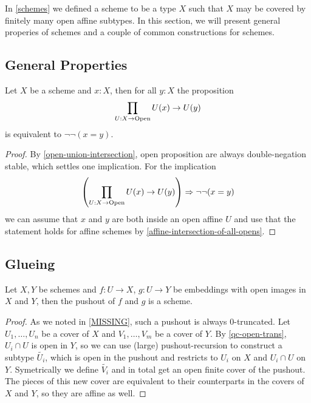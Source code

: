 In \cref{schemes} we defined a scheme to be a type $X$ such that $X$
may be covered by finitely many open affine subtypes.
In this section, we will present general properies of schemes and a couple of common constructions for schemes.


\subsection{General Properties}

\begin{lemma}%
  \label{intersection-of-all-opens}
  Let $X$ be a scheme and $x:X$, then for all $y:X$ the proposition
  \[ \prod_{U:X\to \mathrm{Open}}U(x)\to U(y) \]
  is equivalent to $\neg\neg (x=y)$.
\end{lemma}

\begin{proof}
  By \cref{open-union-intersection},
  open proposition are always double-negation stable,
  which settles one implication.
  For the implication
  \[ \left(\prod_{U:X\to \mathrm{Open}}U(x)\to U(y)\right) \Rightarrow \neg\neg (x=y) \]
  we can assume that $x$ and $y$ are both inside an open affine $U$
  and use that the statement holds for affine schemes by \cref{affine-intersection-of-all-opens}.
\end{proof}

\subsection{Glueing}

\begin{proposition}%
  Let $X,Y$ be schemes and $f:U\to X$, $g:U\to Y$ be embeddings with open images in $X$ and $Y$,
  then the pushout of $f$ and $g$ is a scheme.
\end{proposition}

\begin{proof}
  As we noted in \cref{MISSING}, such a pushout is always 0-truncated.
  Let $U_1,\dots,U_n$ be a cover of $X$ and $V_1,\dots,V_m$ be a cover of $Y$.
  By \cref{qc-open-trans}, $U_i\cap U$ is open in $Y$,
  so we can use (large) pushout-recursion to construct a subtype $\tilde{U_i}$,
  which is open in the pushout and restricts to $U_i$ on $X$ and $U_i\cap U$ on $Y$.
  Symetrically we define $\tilde{V_i}$ and in total get an open finite cover of the pushout.
  The pieces of this new cover are equivalent to their counterparts in the covers of $X$ and $Y$,
  so they are affine as well.
\end{proof}

